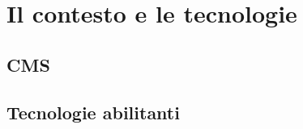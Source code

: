 
\part{Il contesto e le tecnologie}
	\label{part:prima}

	\chapter{CMS}
		\label{cha:cms}
		

	\chapter{Tecnologie abilitanti}
		\label{cha:tecnologie}
		
